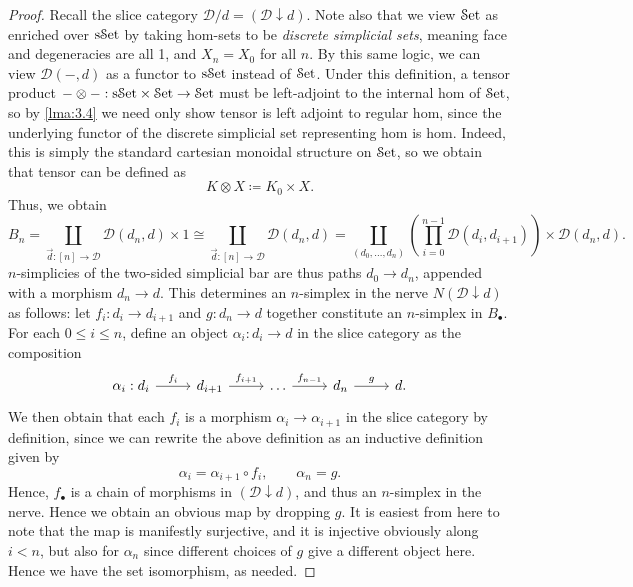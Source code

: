  \begin{proof}
	 Recall the slice category $\mathcal{D} /d=(\mathcal{D} \downarrow d)$. Note also that we view $\mathcal{S}\mathrm{et} $ as enriched over $\mathrm{s}\mathcal{S}\mathrm{et}$ by taking hom-sets to be \emph{discrete simplicial sets}, meaning face and degeneracies are all 1, and $X_n=X_0$ for all $n$. By this same logic, we can view $\mathcal{D} (-,d)$ as a functor to $\mathrm{s}\mathcal{S}\mathrm{et}$ instead of $\mathcal{S}\mathrm{et} $. Under this definition, a tensor product $-\otimes -: \mathrm{s}\mathcal{S}\mathrm{et}\times \mathcal{S}\mathrm{et}  \to \mathcal{S}\mathrm{et} $ must be left-adjoint to the internal hom of $\mathcal{S}\mathrm{et} $, so by \cref{lma:3.4} we need only show tensor is left adjoint to regular hom, since the underlying functor of the discrete simplicial set representing hom is hom. Indeed, this is simply the standard cartesian monoidal structure on $\mathcal{S}\mathrm{et} $, so we obtain that tensor can be defined as
	 \[
	 	K\otimes X\coloneqq K_0 \times X
	 .\]
	 Thus, we obtain
	\[
		B_{n} =\coprod_{\vec{d} : [n] \to \mathcal{D} } \mathcal{D} (d_n,d) \times 1\cong \coprod_{\vec{d} : [n] \to \mathcal{D} } \mathcal{D} (d_n,d)=\coprod_{(d_0, \ldots ,d_n)} \left(\prod_{i=0}^{n-1} \mathcal{D} (d_{i} ,d_{i+1} )\right)\times \mathcal{D} (d_n,d)
	.\]
	$n$-simplicies of the two-sided simplicial bar are thus paths $d_0\to d_n$, appended with a morphism $d_n\to d$. This determines an $n$-simplex in the nerve $N(\mathcal{D} \downarrow d)$ as follows: let $f_i : d_i \to d_{i+1} $ and $g : d_n \to d$ together constitute an $n$-simplex in $B_{\bullet} $. For each $0\leq i\leq n$, define an object $\alpha_i : d_i \to d$ in the slice category as the composition
	\[\begin{tikzcd}[row sep = 2.5em, column sep = 2.5em]
		\alpha_i : d_i\ar[" f_i ", r]  & d_{i+1} \ar[" f_{i+1}  ", r]  & \ldots \ar[" f_{n-1}  ", r]  & d_n\ar[" g ", r] & d.
	\end{tikzcd}\]
	We then obtain that each $f_i$ is a morphism $\alpha_i \to  \alpha_{i+1} $ in the slice category by definition, since we can rewrite the above definition as an inductive definition given by
	\[
		\alpha_i = \alpha_{i+1} \circ f_i,\qquad \alpha_n = g
	.\]
	Hence, $f_{\bullet} $ is a chain of morphisms in $(\mathcal{D} \downarrow d)$, and thus an $n$-simplex in the nerve. Hence we obtain an obvious map by dropping $g$. It is easiest from here to note that the map is manifestly surjective, and it is injective obviously along $i<n$, but also for $\alpha_n$ since different choices of $g$ give a different object here. Hence we have the set isomorphism, as needed.


\end{proof}

